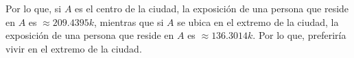 \documentclass[12pt]{exam}
\begin{document}
\begin{questions}
\begin{enumerate}[a)]
  Por lo que, si $A$ es el centro de la ciudad, la exposición de una persona que reside en $A$ es $\approx 209.4395 k$, mientras que si $A$ se ubica en el extremo de la ciudad, la exposición de una persona que reside en $A$ es $\approx 136.3014 k$. Por lo que, preferiría vivir en el extremo de la ciudad.


  \end{enumerate}
  
\end{questions}
\end{document}
